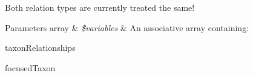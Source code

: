 Both relation types are currently treated the same!


\begin{DoxyParams}[1]{Parameters}
array & {\em \$variables} & An associative array containing\-:
\begin{DoxyItemize}
\item taxon\-Relationships
\item focused\-Taxon 
\end{DoxyItemize}\\
\hline
\end{DoxyParams}
